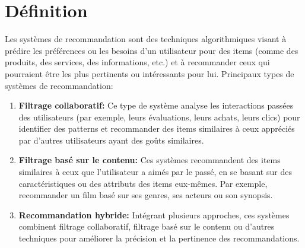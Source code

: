 \documentclass[edit,12pt,a4paper,ChapStyle,oneside,doubleinterligne]{report}
\begin{document}
\section{Définition}
Les systèmes de recommandation sont des techniques algorithmiques visant à prédire les préférences ou les besoins d'un utilisateur pour des items (comme des produits, des services, des informations, etc.) et à recommander ceux qui pourraient être les plus pertinents ou intéressants pour lui.
\newline Principaux types de systèmes de recommandation:
\begin{enumerate}
    \item \textbf{Filtrage collaboratif: }Ce type de système analyse les interactions passées des utilisateurs (par exemple, leurs évaluations, leurs achats, leurs clics) pour identifier des patterns et recommander des items similaires à ceux appréciés par d'autres utilisateurs ayant des goûts similaires.
    \item \textbf{Filtrage basé sur le contenu: }Ces systèmes recommandent des items similaires à ceux que l'utilisateur a aimés par le passé, en se basant sur des caractéristiques ou des attributs des items eux-mêmes. Par exemple, recommander un film basé sur ses genres, ses acteurs ou son synopsis.
    \item \textbf{Recommandation hybride: }Intégrant plusieurs approches, ces systèmes combinent filtrage collaboratif, filtrage basé sur le contenu ou d'autres techniques pour améliorer la précision et la pertinence des recommandations.
\end{enumerate}
\end{document}
